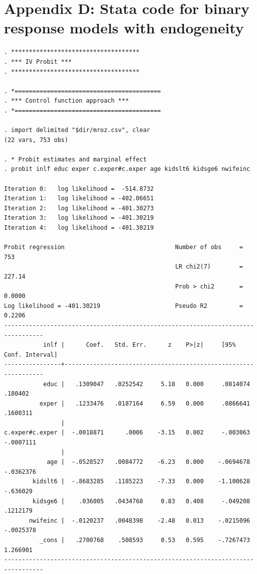 \hypertarget{appendix-d-stata-code-for-binary-response-models-with-endogeneity}{%
\section{Appendix D: Stata code for binary response models with endogeneity}\label{appendix-d-stata-code-for-binary-response-models-with-endogeneity}}

\begin{verbatim}
. ************************************
. *** IV Probit ***
. ************************************

. *=========================================
. *** Control function approach ***
. *=========================================

. import delimited "$dir/mroz.csv", clear 
(22 vars, 753 obs)

. * Probit estimates and marginal effect 
. probit inlf educ exper c.exper#c.exper age kidslt6 kidsge6 nwifeinc

Iteration 0:   log likelihood =  -514.8732  
Iteration 1:   log likelihood = -402.06651  
Iteration 2:   log likelihood = -401.30273  
Iteration 3:   log likelihood = -401.30219  
Iteration 4:   log likelihood = -401.30219  

Probit regression                               Number of obs     =        753
                                                LR chi2(7)        =     227.14
                                                Prob > chi2       =     0.0000
Log likelihood = -401.30219                     Pseudo R2         =     0.2206
---------------------------------------------------------------------------------
           inlf |      Coef.   Std. Err.      z    P>|z|     [95% Conf. Interval]
----------------+----------------------------------------------------------------
           educ |   .1309047   .0252542     5.18   0.000     .0814074     .180402
          exper |   .1233476   .0187164     6.59   0.000     .0866641    .1600311
                |
c.exper#c.exper |  -.0018871      .0006    -3.15   0.002     -.003063   -.0007111
                |
            age |  -.0528527   .0084772    -6.23   0.000    -.0694678   -.0362376
        kidslt6 |  -.8683285   .1185223    -7.33   0.000    -1.100628    -.636029
        kidsge6 |    .036005   .0434768     0.83   0.408     -.049208    .1212179
       nwifeinc |  -.0120237   .0048398    -2.48   0.013    -.0215096   -.0025378
          _cons |   .2700768    .508593     0.53   0.595    -.7267473    1.266901
---------------------------------------------------------------------------------


\end{verbatim}
